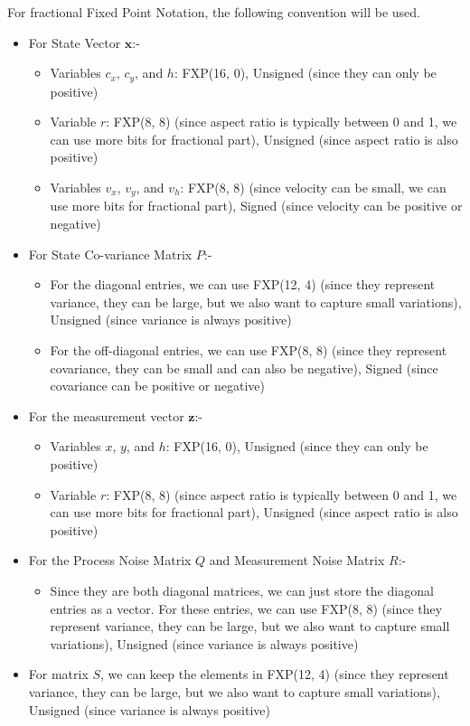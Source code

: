 \documentclass[10pt]{article}
\begin{document}
    \noindent For fractional Fixed Point Notation, the following convention will be used.
    \begin{itemize}
        \item For State Vector \(\mathbf{x}\):-
            \begin{itemize}
                \item Variables \(c_x\), \(c_y\), and \(h\): FXP(16, 0), Unsigned (since they can only be positive)
                \item Variable \(r\): FXP(8, 8) (since aspect ratio is typically between 0 and 1, 
                we can use more bits for fractional part), Unsigned (since aspect ratio is also positive)
                \item Variables \(v_x\), \(v_y\), and \(v_h\): FXP(8, 8) (since velocity can be small, 
                we can use more bits for fractional part), Signed (since velocity can be positive or negative)
            \end{itemize}
        \item For State Co-variance Matrix \(P\):- 
            \begin{itemize}
                \item For the diagonal entries, we can use FXP(12, 4) (since they represent variance, they can be large, but we also want to 
                capture small variations), Unsigned (since variance is always positive)
                \item For the off-diagonal entries, we can use FXP(8, 8) (since they represent covariance, they can be small and can also be negative), 
                Signed (since covariance can be positive or negative)
            \end{itemize}
        \item For the measurement vector \(\mathbf{z}\):-
            \begin{itemize}
                \item Variables \(x\), \(y\), and \(h\): FXP(16, 0), Unsigned (since they can only be positive)
                \item Variable \(r\): FXP(8, 8) (since aspect ratio is typically between 0 and 1, 
                we can use more bits for fractional part), Unsigned (since aspect ratio is also positive)
            \end{itemize}
        \item For the Process Noise Matrix \(Q\) and Measurement Noise Matrix \(R\):-
            \begin{itemize}
                \item Since they are both diagonal matrices, we can just store the diagonal entries as a vector. For these entries, we can use FXP(8, 8) 
                (since they represent variance, they can be large, but we also want to capture small variations), 
                Unsigned (since variance is always positive)
            \end{itemize}
        \item For matrix \(S\), we can keep the elements in FXP(12, 4) (since they represent variance, they can be large, but we also want to capture 
        small variations), Unsigned (since variance is always positive)


\end{itemize}
\end{document}
